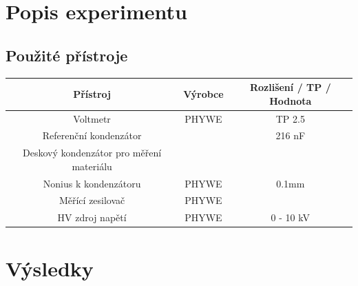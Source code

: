 \documentclass[titlepage]{article}
\begin{document}
    	\section{Popis experimentu}
    		\subsection{Použité přístroje}
    		\begin{tabular}{| c | c | c |}
    			\hline
    			\textbf{Přístroj} & \textbf{Výrobce} & \textbf{Rozlišení / TP / Hodnota}\\
			\hline
			\hline
			Voltmetr & PHYWE & TP 2.5\\
			\hline
			Referenční kondenzátor & & 216 nF\\
			\hline
			Deskový kondenzátor pro měření materiálu & & \\
			\hline
			Nonius k kondenzátoru & PHYWE & 0.1mm\\
			\hline
			Měřící zesilovač & PHYWE & \\
			\hline
			HV zdroj napětí & PHYWE & 0 - 10 kV\\
			\hline
    		\end{tabular}
    	\section{Výsledky}
\end{document}
